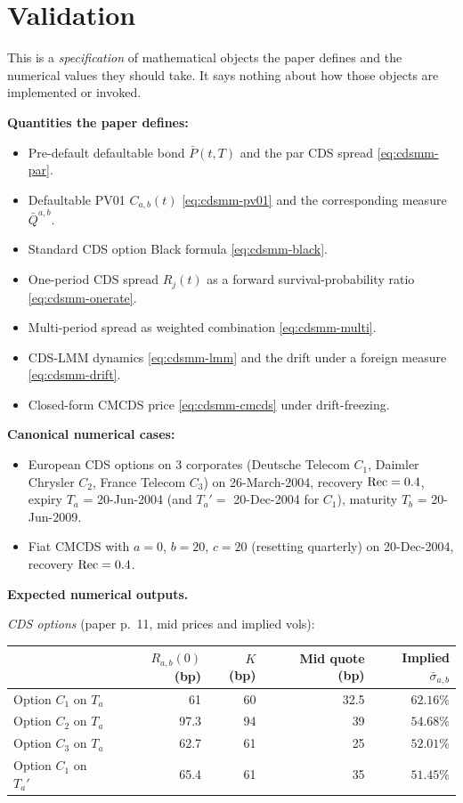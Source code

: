 \documentclass[11pt,a4paper]{article}
\begin{document}
\section{Validation}

\begin{validation}
This is a \emph{specification} of mathematical objects the paper
defines and the numerical values they should take. It says nothing
about how those objects are implemented or invoked.

\textbf{Quantities the paper defines:}
\begin{itemize}[noitemsep]
  \item Pre-default defaultable bond $\bar P(t, T)$ and the par CDS
        spread \eqref{eq:cdsmm-par}.
  \item Defaultable PV01 $C_{a,b}(t)$ \eqref{eq:cdsmm-pv01} and the
        corresponding measure $\bar Q^{a,b}$.
  \item Standard CDS option Black formula \eqref{eq:cdsmm-black}.
  \item One-period CDS spread $R_j(t)$ as a forward survival-probability
        ratio \eqref{eq:cdsmm-onerate}.
  \item Multi-period spread as weighted combination
        \eqref{eq:cdsmm-multi}.
  \item CDS-LMM dynamics \eqref{eq:cdsmm-lmm} and the drift under a
        foreign measure \eqref{eq:cdsmm-drift}.
  \item Closed-form CMCDS price \eqref{eq:cdsmm-cmcds} under
        drift-freezing.
\end{itemize}

\textbf{Canonical numerical cases:}
\begin{itemize}[noitemsep]
  \item European CDS options on 3 corporates (Deutsche Telecom $C_1$,
        Daimler Chrysler $C_2$, France Telecom $C_3$) on
        26-March-2004, recovery $\mathrm{Rec} = 0.4$, expiry $T_a$ = 20-Jun-2004
        (and $T_a' = $ 20-Dec-2004 for $C_1$), maturity $T_b$ =
        20-Jun-2009.
  \item Fiat CMCDS with $a = 0$, $b = 20$, $c = 20$ (resetting
        quarterly) on 20-Dec-2004, recovery $\mathrm{Rec} = 0.4$.
\end{itemize}

\textbf{Expected numerical outputs.}

\smallskip
\textit{CDS options} (paper p.~11, mid prices and implied vols):
\begin{tabular}{@{}lrrrr@{}}
\toprule
                & $R_{a,b}(0)$ (bp) & $K$ (bp) & Mid quote (bp) & Implied $\bar\sigma_{a,b}$ \\
\midrule
Option $C_1$ on $T_a$  & 61    & 60 & 32.5 & $62.16\%$ \\
Option $C_2$ on $T_a$  & 97.3  & 94 & 39   & $54.68\%$ \\
Option $C_3$ on $T_a$  & 62.7  & 61 & 25   & $52.01\%$ \\
Option $C_1$ on $T_a'$ & 65.4  & 61 & 35   & $51.45\%$ \\
\bottomrule
\end{tabular}
\smallskip


\end{validation}
\end{document}
